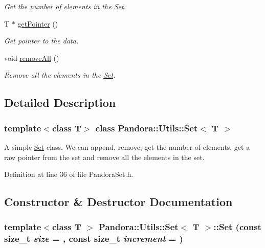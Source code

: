 \begin{DoxyCompactItemize}
\begin{DoxyCompactList}\small\item\em Get the number of elements in the \hyperlink{classPandora_1_1Utils_1_1Set}{Set}. \item\end{DoxyCompactList}\item 
T $\ast$ \hyperlink{classPandora_1_1Utils_1_1Set_a57d191182540ce79e9a0db1cf52ddd10}{getPointer} ()
\begin{DoxyCompactList}\small\item\em Get pointer to the data. \item\end{DoxyCompactList}\item 
void \hyperlink{classPandora_1_1Utils_1_1Set_aa134d362ed2baacc3ca0864cb6f10cb7}{removeAll} ()
\begin{DoxyCompactList}\small\item\em Remove all the elements in the \hyperlink{classPandora_1_1Utils_1_1Set}{Set}. \item\end{DoxyCompactList}\end{DoxyCompactItemize}


\subsection{Detailed Description}
\subsubsection*{template$<$class T$>$ class Pandora::Utils::Set$<$ T $>$}

A simple \hyperlink{classPandora_1_1Utils_1_1Set}{Set} class. We can append, remove, get the number of elements, get a raw pointer from the set and remove all the elements in the set. 

Definition at line 36 of file PandoraSet.h.

\subsection{Constructor \& Destructor Documentation}
\hypertarget{classPandora_1_1Utils_1_1Set_ad0e4e02f649fcefffe61115758e1261c}{
\subsubsection[{Set}]{\setlength{\rightskip}{0pt plus 5cm}template$<$class T $>$ {\bf Pandora::Utils::Set}$<$ T $>$::{\bf Set} (const size\_\-t {\em size} = {}, \/  const size\_\-t {\em increment} = {})}}
\label{classPandora_1_1Utils_1_1Set_ad0e4e02f649fcefffe61115758e1261c}


